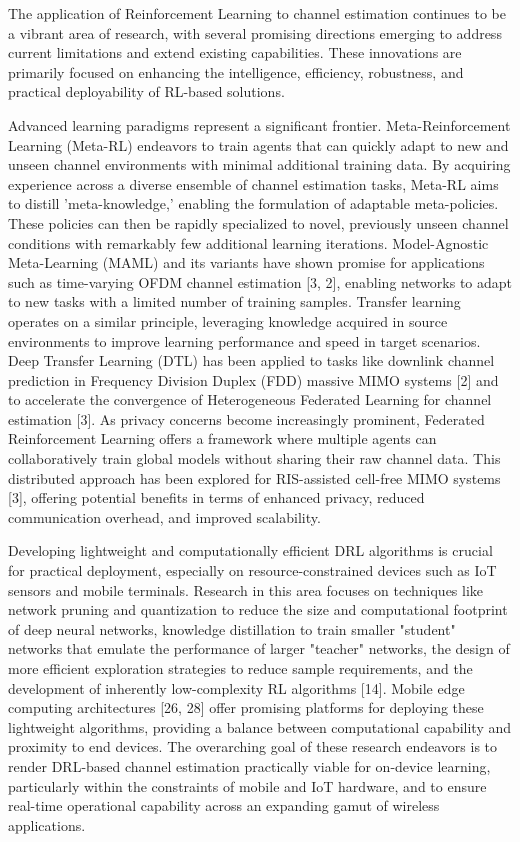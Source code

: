 \documentclass[journal,twocolumn]{IEEEtran}
\begin{document}
The application of Reinforcement Learning to channel estimation continues to be a vibrant area of research, with several promising directions emerging to address current limitations and extend existing capabilities. These innovations are primarily focused on enhancing the intelligence, efficiency, robustness, and practical deployability of RL-based solutions.

Advanced learning paradigms represent a significant frontier. Meta-Reinforcement Learning (Meta-RL) endeavors to train agents that can quickly adapt to new and unseen channel environments with minimal additional training data. By acquiring experience across a diverse ensemble of channel estimation tasks, Meta-RL aims to distill 'meta-knowledge,' enabling the formulation of adaptable meta-policies. These policies can then be rapidly specialized to novel, previously unseen channel conditions with remarkably few additional learning iterations. Model-Agnostic Meta-Learning (MAML) and its variants have shown promise for applications such as time-varying OFDM channel estimation [3, 2], enabling networks to adapt to new tasks with a limited number of training samples. Transfer learning operates on a similar principle, leveraging knowledge acquired in source environments to improve learning performance and speed in target scenarios. Deep Transfer Learning (DTL) has been applied to tasks like downlink channel prediction in Frequency Division Duplex (FDD) massive MIMO systems [2] and to accelerate the convergence of Heterogeneous Federated Learning for channel estimation [3]. As privacy concerns become increasingly prominent, Federated Reinforcement Learning offers a framework where multiple agents can collaboratively train global models without sharing their raw channel data. This distributed approach has been explored for RIS-assisted cell-free MIMO systems [3], offering potential benefits in terms of enhanced privacy, reduced communication overhead, and improved scalability.

Developing lightweight and computationally efficient DRL algorithms is crucial for practical deployment, especially on resource-constrained devices such as IoT sensors and mobile terminals. Research in this area focuses on techniques like network pruning and quantization to reduce the size and computational footprint of deep neural networks, knowledge distillation to train smaller "student" networks that emulate the performance of larger "teacher" networks, the design of more efficient exploration strategies to reduce sample requirements, and the development of inherently low-complexity RL algorithms [14]. Mobile edge computing architectures [26, 28] offer promising platforms for deploying these lightweight algorithms, providing a balance between computational capability and proximity to end devices. The overarching goal of these research endeavors is to render DRL-based channel estimation practically viable for on-device learning, particularly within the constraints of mobile and IoT hardware, and to ensure real-time operational capability across an expanding gamut of wireless applications.
\end{document}
